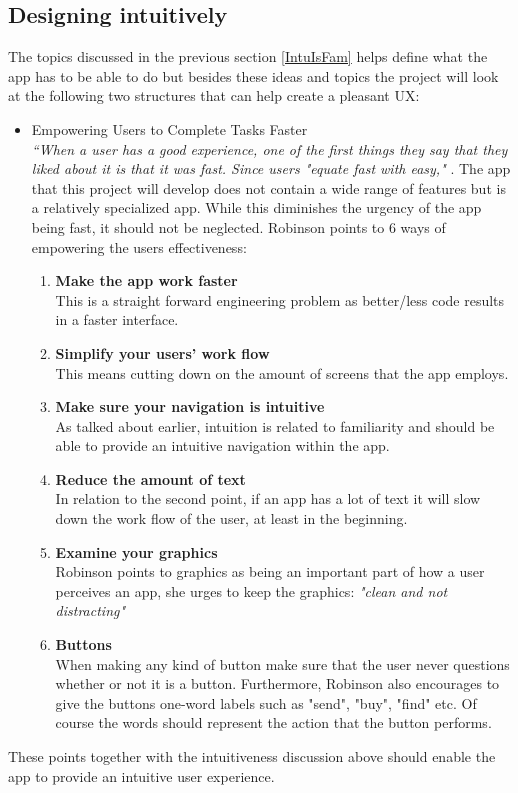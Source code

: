 \subsection{Designing intuitively}
The topics discussed in the previous section \ref{IntuIsFam} helps define what the app has to be 
able to do but besides these ideas and topics the project will look at the following two structures that can help create a pleasant UX:
\begin{itemize}
\item  Empowering Users to Complete Tasks Faster\\
 \textit{“When a user has a good experience, one of the first things they say 
 that they liked about it is that it was fast. Since users "equate fast with 
 easy," }.\cite{UXKeys} The app that this project will develop does not contain a 
 wide range of features but is a relatively specialized app. While this 
 diminishes the urgency of the app being fast, it should not be neglected. \label{EvalConFast}
 Robinson points to 6 ways of empowering the users effectiveness\cite{UXKeys}:
 \begin{enumerate}
 \item \textbf{Make the app work faster}\\
 This is a straight forward engineering problem as better/less code results in a 
 faster interface. 
 \item \textbf{Simplify your users’ work flow}\\
  This means cutting down on the amount of screens that the app employs.
 \item \textbf{Make sure your navigation is intuitive}\\\label{effectivenessP3}
 As talked about earlier, intuition is related to familiarity and should be able to provide an 
 intuitive navigation within the app.
 \item \textbf{Reduce the amount of text}\\
 In relation to the second point, if an app has a lot of text it will slow down 
 the work flow of the user, at least in the beginning.
 \item \textbf{Examine your graphics}\\
 Robinson points to graphics as being an important part of how a user perceives 
 an app, she urges to keep the graphics: \textit{"clean and not distracting"} 
 \item \textbf{Buttons}\\
 When making any kind of button make sure that the user never questions whether 
 or not it is a button. Furthermore, Robinson also encourages to give the buttons one-word labels such as "send", "buy", "find" etc. Of course the words should 
 represent the action that the button performs.
 \end{enumerate} 
\end{itemize} 
These points together with the intuitiveness discussion above should enable the 
app to provide an intuitive user experience. 

